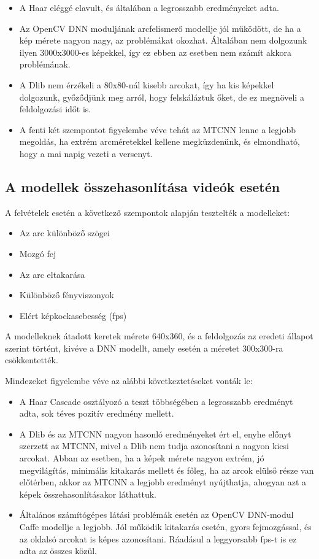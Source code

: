\begin{itemize}
    \item A Haar eléggé elavult, és általában a legrosszabb eredményeket adta.
    \item Az OpenCV DNN moduljának arcfelismerő modellje jól működött, de ha a kép mérete nagyon nagy, az problémákat okozhat. Általában nem dolgozunk ilyen 3000x3000-es képekkel, így ez ebben az esetben nem számít akkora problémának.
    \item A Dlib nem érzékeli a 80x80-nál kisebb arcokat, így ha kis képekkel dolgozunk, győződjünk meg arról, hogy felskáláztuk őket, de ez megnöveli a feldolgozási időt is.
    \item A fenti két szempontot figyelembe véve tehát az MTCNN lenne a legjobb megoldás, ha extrém arcméretekkel kellene megküzdenünk, és elmondható, hogy a mai napig vezeti a versenyt.
\end{itemize}

\subsection{A modellek összehasonlítása videók esetén}



A felvételek esetén a következő szempontok alapján tesztelték a modelleket:

\begin{itemize}
    \item Az arc különböző szögei
    \item Mozgó fej
    \item Az arc eltakarása
    \item Különböző fényviszonyok
    \item Elért képkockasebesség (fps)
\end{itemize}

A modelleknek átadott keretek mérete 640x360, és a feldolgozás az eredeti állapot szerint történt, kivéve a DNN modellt, amely esetén a méretet 300x300-ra csökkentették.

Mindezeket figyelembe véve az alábbi következtetéseket vonták le:

\begin{itemize}
    \item A Haar Cascade osztályozó a teszt többségében a legrosszabb eredményt adta, sok téves pozitív eredmény mellett.
    \item A Dlib és az MTCNN nagyon hasonló eredményeket ért el, enyhe előnyt szerzett az MTCNN, mivel a Dlib nem tudja azonosítani a nagyon kicsi arcokat. Abban az esetben, ha a képek mérete nagyon extrém, jó megvilágítás, minimális kitakarás mellett és főleg, ha az arcok elülső része van előtérben, akkor az MTCNN a legjobb eredményt nyújthatja, ahogyan azt a képek összehasonlításakor láthattuk.
    \item Általános számítógépes látási problémák esetén az OpenCV DNN-modul Caffe modellje a legjobb. Jól működik kitakarás esetén, gyors fejmozgással, és az oldalsó arcokat is képes azonosítani. Ráadásul a leggyorsabb fps-t is ez adta az összes közül.
\end{itemize}


